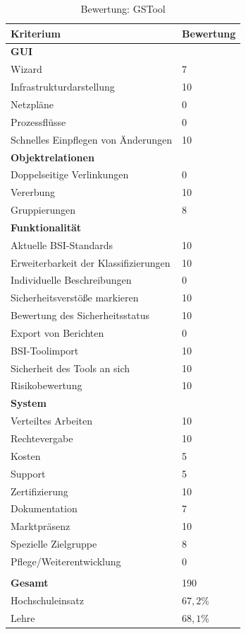 \begin{table}[h!bt]
\begin{tabular}{|p{}|p{}|}
\hline 
Kriterium & Bewertung\\ 
\hline 
\textbf{GUI}& \\
\hline
Wizard & 7\\
\hline 
Infrastrukturdarstellung & 10 \\
\hline 
Netzpläne & 0 \\
\hline 
Prozessflüsse & 0 \\
\hline 
Schnelles Einpflegen von Änderungen & 10 \\
\hline
\textbf{Objektrelationen} & \\
\hline 
Doppelseitige Verlinkungen & 0 \\
\hline 
Vererbung & 10 \\
\hline 
Gruppierungen & 8 \\
\hline 
\textbf{Funktionalität} &\\
\hline 
Aktuelle BSI-Standards & 10 \\
\hline  
Erweiterbarkeit der Klassifizierungen & 10 \\
\hline 
Individuelle Beschreibungen & 0 \\
\hline 
Sicherheitsverstöße markieren & 10 \\
\hline
Bewertung des Sicherheitsstatus & 10 \\
\hline
Export von Berichten & 0 \\
\hline
BSI-Toolimport & 10 \\
\hline
Sicherheit des Tools an sich & 10 \\
\hline
Risikobewertung & 10 \\
\hline
\textbf{System}&  \\
\hline
Verteiltes Arbeiten & 10 \\
\hline
Rechtevergabe & 10 \\
\hline
Kosten & 5 \\
\hline
Support & 5 \\
\hline
Zertifizierung & 10 \\
\hline
Dokumentation & 7 \\
\hline
Marktpräsenz & 10 \\
\hline
Spezielle Zielgruppe & 8 \\
\hline
Pflege/Weiterentwicklung & 0 \\
\hline
\multicolumn{2}{c}{}\\
\hline
\textbf{Gesamt} & 190\\
\hline
Hochschuleinsatz & $67,2\%$\\
\hline
Lehre & $68,1\%$\\
\hline
\end{tabular} 
\caption{Bewertung: GSTool}
\label{tab:BewertungGSTool}
\end{table}